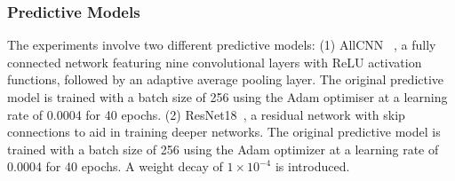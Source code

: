 \documentclass[preprint,12pt]{elsarticle}
\begin{document}
\subsubsection{Predictive Models}
The experiments involve two different predictive models: (1) AllCNN ~\cite{springenberg2014striving}, a fully connected network featuring nine convolutional layers with ReLU activation functions, followed by an adaptive average pooling layer. The original predictive model is trained with a batch size of 256 using the Adam optimiser at a learning rate of 0.0004 for 40 epochs. (2) ResNet18~\cite{he2016deep}, a residual network with skip connections to aid in training deeper networks. The original predictive model is trained with a batch size of 256 using the Adam optimizer at a learning rate of 0.0004 for 40 epochs. A weight decay of $1 \times 10^{-4}$ is introduced.
\end{document}
